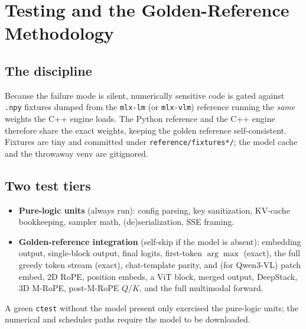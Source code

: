 \documentclass[11pt,a4paper]{report}
\newcommand{\code}[1]{\texttt{#1}}
\begin{document}
\chapter{Testing and the Golden-Reference Methodology}
\label{ch:testing}

\section{The discipline}
Because the failure mode is silent, numerically sensitive code is gated against
\code{.npy} fixtures dumped from the \code{mlx-lm} (or \code{mlx-vlm}) reference
running the \emph{same} weights the C++ engine loads. The Python reference and the
C++ engine therefore share the exact weights, keeping the golden reference
self-consistent. Fixtures are tiny and committed under \code{reference/fixtures*/};
the model cache and the throwaway venv are gitignored.

\section{Two test tiers}
\begin{itemize}[nosep]
  \item \textbf{Pure-logic units} (always run): config parsing, key sanitization,
        KV-cache bookkeeping, sampler math, (de)serialization, SSE framing.
  \item \textbf{Golden-reference integration} (self-skip if the model is absent):
        embedding output, single-block output, final logits, first-token
        $\arg\max$ (exact), the full greedy token stream (exact), chat-template
        parity, and (for Qwen3-VL) patch embed, 2D RoPE, position embeds, a
        ViT block, merged output, DeepStack, 3D M-RoPE, post-M-RoPE $Q/K$, and the
        full multimodal forward.
\end{itemize}
A green \code{ctest} without the model present only exercised the pure-logic units;
the numerical and scheduler paths require the model to be downloaded.
\end{document}
